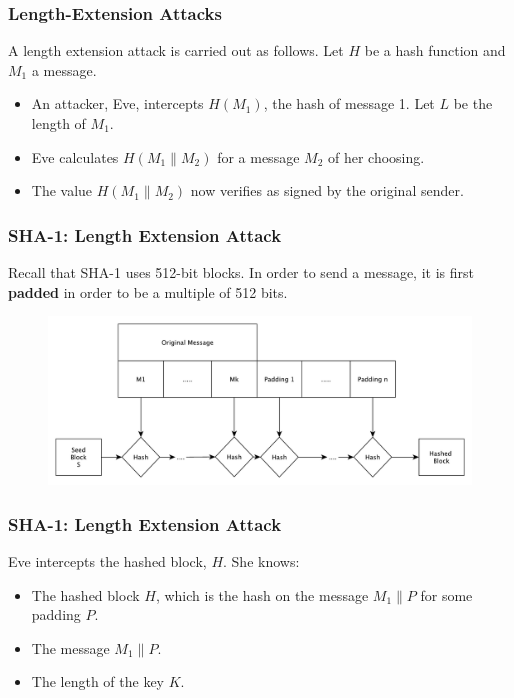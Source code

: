 \documentclass{beamer}
\newcommand{\<}{\langle}
\renewcommand{\>}{\rangle}
\begin{document}
\begin{frame}
\frametitle{Length-Extension Attacks}

A length extension attack is carried out as follows. Let $H$ be a hash function and $M_1$ a message.
\begin{itemize}
\item An attacker, Eve, intercepts $H(M_1)$, the hash of message 1. Let $L$ be the length of $M_1$. 
\item Eve calculates $H(M_1 \| M_2)$ for a message $M_2$ of her choosing.
\item The value $H(M_1\| M_2)$ now verifies as signed by the original sender.
\end{itemize}
\end{frame}

\begin{frame}
\frametitle{SHA-1: Length Extension Attack}

Recall that SHA-1 uses 512-bit blocks. In order to send a message, it is first \textbf{padded} in order to be a multiple of 512 bits. 

\begin{figure}
\includegraphics[scale=.4]{IMG/padding}
\end{figure}
\end{frame}

\begin{frame}
\frametitle{SHA-1: Length Extension Attack}

Eve intercepts the hashed block, $H$. She knows:
\begin{itemize}
\item The hashed block $H$, which is the hash on the message $M_1 \| P$ for some padding $P$.
\item The message $M_1 \| P$.
\item The length of the key $K$.
\end{itemize}
\end{frame}
\end{document}
